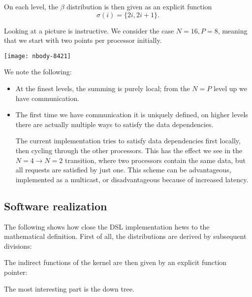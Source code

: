 On each level, the $\beta$ distribution is then given
as an explicit function \[ \sigma(i)=\{2i,2i+1\}. \]

Looking at a picture is instructive. We consider the case $N=16,P=8$, meaning that we 
start with two points per processor initially.

\texttt{[image: nbody-8421]}

We note the following:
\begin{itemize}
\item At the finest levels, the summing is purely local; from the
  $N=P$ level up we have communication.
\item The first time we have communication it is uniquely defined, on higher levels
  there are actually multiple ways to satisfy the data dependencies.

  The current implementation tries to satisfy data dependencies first
  locally, then cycling through the other processors. This has the
  effect we see in the $N=4\rightarrow N=2$ transition, where two
  processors contain the same data, but all requests are satisfied by
  just one. This scheme can be advantageous, implemented as a
  multicast, or disadvantageous because of increased latency.
\end{itemize}

\subsection{Software realization}

The following shows how close the DSL implementation hews to the
mathematical definition. First of all, the distributions are derived
by subsequent divisions:
%

The indirect functions of the kernel are then given by
an explicit function pointer:
%

The most interesting part is the down tree.
%
